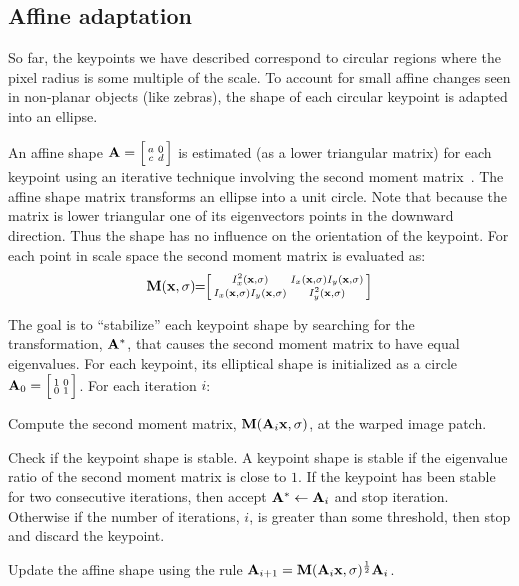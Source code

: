     \subsection{Affine adaptation}
        So far, the keypoints we have described correspond to circular
          regions where the pixel radius is some multiple of the scale.
        To account for small affine changes seen in non-planar objects
          (like zebras), the shape of each circular keypoint is adapted
          into an ellipse.

        An affine shape $\mathbf{A}= \Bigl[ \begin{smallmatrix} a & 0\\c & d \end{smallmatrix} \Bigr] $ is estimated (as a lower triangular
          matrix) for each keypoint using an iterative technique involving the
          second moment
          matrix~\cite{lindeberg_shapeadapted_1997,baumberg_reliable_2000,mikolajczyk_comparison_2005}.
        The affine shape matrix transforms an ellipse into a unit circle.
        Note that because the matrix is lower triangular one of its
          eigenvectors points in the downward direction.
        Thus the shape has no influence on the orientation of the keypoint.
        For each point in scale space the second moment matrix is evaluated
          as:
        \begin{equation}\label{eqn:secondmoment}
                \mathbf{M}(\mathbf{x}, \sigma) 
                \mkern-6mu=\mkern-6mu 
                 \Bigl[ \begin{smallmatrix}  
                I_x^2(\mathbf{x}, \sigma)      & I_x(\mathbf{x}, \sigma) I_y(\mathbf{x}, \sigma) \\
                I_x(\mathbf{x}, \sigma) I_y(\mathbf{x}, \sigma) & I_y^2(\mathbf{x}, \sigma)  \end{smallmatrix} \Bigr] 
        \end{equation}

        The goal is to ``stabilize'' each keypoint shape by searching for the
          transformation, $\mathbf{A}^*$, that causes the second moment matrix to
          have equal eigenvalues.
        For each keypoint, its elliptical shape is initialized as a circle
          $\mathbf{A}_0= \Bigl[ \begin{smallmatrix} 1 & 0\\0 & 1 \end{smallmatrix} \Bigr] $.
        For each iteration $i$:

        \begin{enumln}

            \item Compute the second moment matrix,
              $\mathbf{M}(\mathbf{A}_i\mathbf{x}, \sigma)$, at the warped image patch.

            \item Check if the keypoint shape is stable.
            A keypoint shape is stable if the eigenvalue ratio of the second
              moment matrix is close to $1$.
            If the keypoint has been stable for two consecutive iterations, then
              accept $\mathbf{A}^* \leftarrow \mathbf{A}_{i}$ and stop iteration.
            Otherwise if the number of iterations, $i$, is greater than some
              threshold, then stop and discard the keypoint.

            \item Update the affine shape  using the rule
                $\mathbf{A}_{i + 1} = \mathbf{M}(\mathbf{A}_i\mathbf{x}, \sigma)^{\frac{1}{2}} \mathbf{A}_i$.
        \end{enumln}

